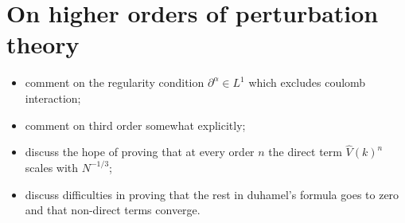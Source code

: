 \section{On higher orders of perturbation theory}

\begin{itemize}
	\item comment on the regularity condition $\partial^\alpha\in L^1$ which excludes coulomb
		interaction;
	\item comment on third order somewhat explicitly;
	\item discuss the hope of proving that at every order $n$ the direct term $\hat{V}(k)^n$
		scales with $N^{-1/3}$;
	\item discuss difficulties in proving that the rest in duhamel's formula goes to zero
		and that non-direct terms converge.
\end{itemize}
